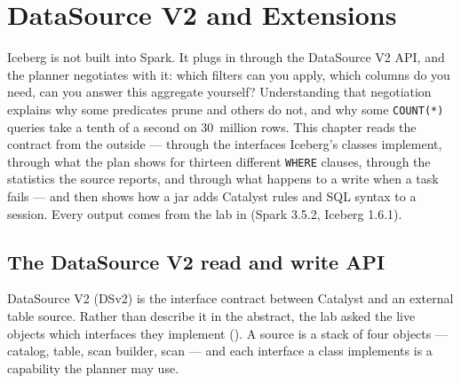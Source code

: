 \chapter{DataSource V2 and Extensions}
\label{ch:dsv2}

\begin{chapterintro}
Iceberg is not built into Spark. It plugs in through the DataSource V2 API, and the
planner negotiates with it: which filters can you apply, which columns do you need,
can you answer this aggregate yourself? Understanding that negotiation explains why
some predicates prune and others do not, and why some \texttt{COUNT(*)} queries take
a tenth of a second on 30~million rows. This chapter reads the contract from the
outside --- through the interfaces Iceberg's classes implement, through what the
plan shows for thirteen different \texttt{WHERE} clauses, through the statistics the
source reports, and through what happens to a write when a task fails --- and then
shows how a jar adds Catalyst rules and SQL syntax to a session. Every output comes
from the lab in  (Spark 3.5.2, Iceberg 1.6.1).
\end{chapterintro}

\section{The DataSource V2 read and write API}
\label{sec:dsv2-api}

DataSource V2 (DSv2) is the interface contract between Catalyst and an external
table source. Rather than describe it in the abstract, the lab asked the live
objects which interfaces they implement (). A source is
a stack of four objects --- catalog, table, scan builder, scan --- and each
interface a class implements is a capability the planner may use.

